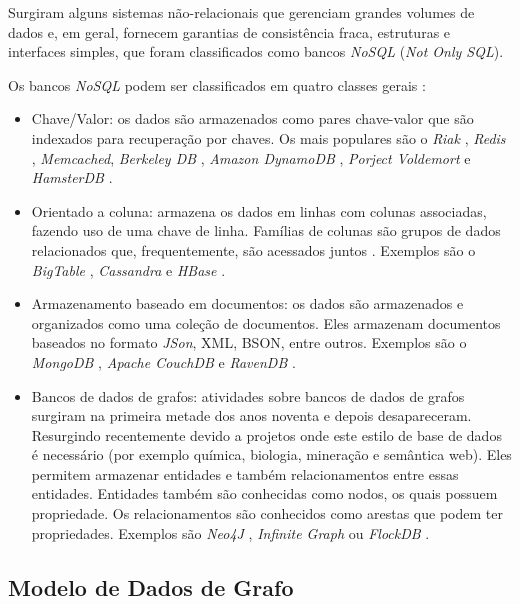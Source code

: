 Surgiram alguns sistemas não-relacionais que gerenciam grandes volumes de dados e, em geral, fornecem garantias de consistência fraca, estruturas e interfaces simples, que foram classificados como bancos \textit{NoSQL} (\textit{Not Only SQL}).

Os bancos \textit{NoSQL} podem ser classificados em quatro classes gerais \cite{rabi}:

\begin{itemize}
\item Chave/Valor: os dados são armazenados como pares chave-valor que são indexados para recuperação por chaves.  Os mais populares são o \textit{Riak} \cite{riak}, \textit{Redis} \cite{redis}, \textit{Memcached}, \textit{Berkeley DB} \cite{berkeley}, \textit{Amazon DynamoDB} \cite{dynamodb}, \textit{Porject Voldemort} \cite{pvoldemort} e \textit{HamsterDB} \cite{hamsterdb}.
\item Orientado a coluna: armazena os dados em linhas com colunas associadas, fazendo uso de uma chave de linha. Famílias de colunas são grupos de dados relacionados que, frequentemente, são acessados juntos \cite{fowler}. Exemplos são o \textit{BigTable} \cite{chang2008bigtable}, \textit{Cassandra} \cite{cassandra} e \textit{HBase} \cite{hbase}.
\item Armazenamento baseado em documentos: os dados são armazenados e organizados como uma coleção de documentos. Eles armazenam documentos baseados no formato \textit{JSon}, XML, BSON, entre outros. Exemplos são o \textit{MongoDB} \cite{mongodb}, \textit{Apache CouchDB} \cite{couchdb} e \textit{RavenDB} \cite{ravendb}.
\item Bancos de dados de grafos: atividades sobre bancos de dados de grafos surgiram na primeira metade dos anos noventa e depois desapareceram. Resurgindo recentemente devido a projetos onde este estilo de base de dados é necessário (por exemplo química, biologia, mineração e semântica web)\cite{angles}. Eles permitem armazenar entidades e também relacionamentos entre essas entidades. Entidades também são conhecidas como nodos, os quais possuem propriedade. Os relacionamentos são conhecidos como arestas que podem ter propriedades. Exemplos são \textit{Neo4J} \cite{neo4j}, \textit{Infinite Graph} \cite{infinitegraph} ou \textit{FlockDB} \cite{flockDB}.
\end{itemize}

\subsection{Modelo de Dados de Grafo}

